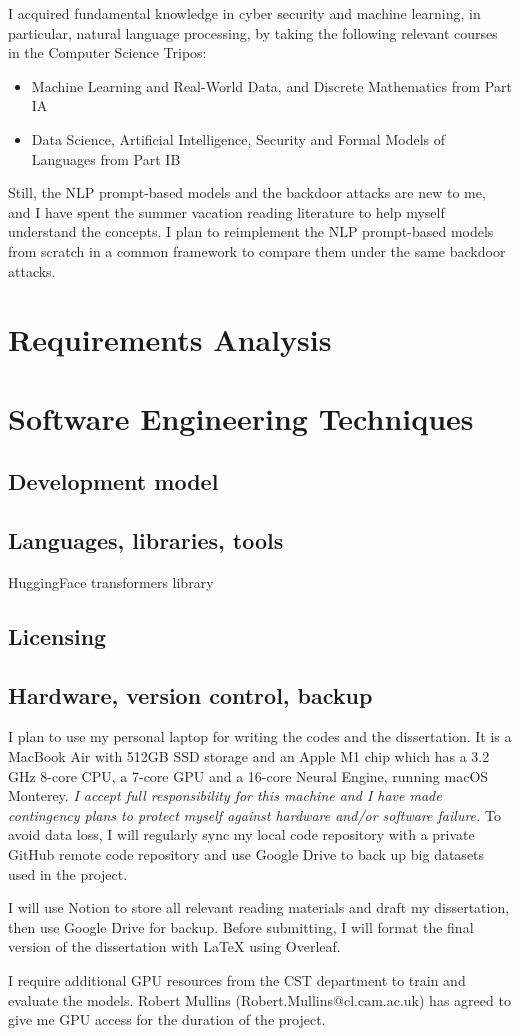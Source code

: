 I acquired fundamental knowledge in cyber security and machine learning, in particular, natural language processing, by taking the following relevant courses in the Computer Science Tripos:
\begin{itemize}
    \item Machine Learning and Real-World Data, and Discrete Mathematics from Part IA
    \item Data Science, Artificial Intelligence, Security and Formal Models of Languages from Part IB
\end{itemize}

Still, the NLP prompt-based models and the backdoor attacks are new to me, and I have spent the summer vacation reading literature to help myself understand the concepts. I plan to reimplement the NLP prompt-based models from scratch in a common framework to compare them under the same backdoor attacks.

\section{Requirements Analysis}
\section{Software Engineering Techniques}
\subsection{Development model}
\subsection{Languages, libraries, tools}
HuggingFace transformers library \cite{Wolf19hugtransf}
\subsection{Licensing}
\subsection{Hardware, version control, backup}
I plan to use my personal laptop for writing the codes and the dissertation. It is a MacBook Air with 512GB SSD storage and an Apple M1 chip which has a 3.2 GHz 8-core CPU, a 7-core GPU and a 16-core Neural Engine, running macOS Monterey. \textit{I accept full responsibility for this machine and I have made contingency plans to protect myself against hardware and/or software failure.} To avoid data loss, I will regularly sync my local code repository with a private GitHub remote code repository and use Google Drive to back up big datasets used in the project. 

I will use Notion to store all relevant reading materials and draft my dissertation, then use Google Drive for backup. Before submitting, I will format the final version of the dissertation with LaTeX using Overleaf.

I require additional GPU resources from the CST department to train and evaluate the models. Robert Mullins (Robert.Mullins@cl.cam.ac.uk) has agreed to give me GPU access for the duration of the project.

